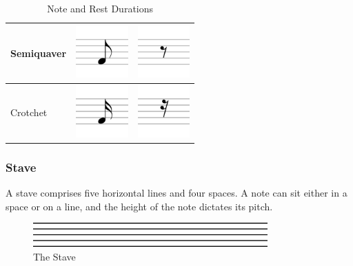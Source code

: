 \begin{table}[h]
\begin{tabular}{| >{\centering\arraybackslash}m{1in} | >{\centering\arraybackslash}m{1in} | >{\centering\arraybackslash}m{1in} |}
                    Semiquaver&
                            \includegraphics[width=20mm]{./assets/8th.png}
                            &
                            \includegraphics[width=20mm]{./assets/8threst.png} \\ \hline
                    Crotchet&
                            \includegraphics[width=20mm]{./assets/16th.png}
                            &
                            \includegraphics[width=20mm]{./assets/16threst.png} \\ \hline
                \end{tabular}
                \caption{Note and Rest Durations}
                \label{table:notes}
            \end{table}
        \subsubsection{Stave}
            A stave comprises five horizontal lines and four spaces. A note can sit either in a space or on a line, and the height of the note dictates its pitch.
            \begin{figure}[ht!]
                \centering
                \includegraphics[width=90mm]{./assets/staff.png}
                \caption{The Stave}
                \label{image:stave}
            \end{figure}
